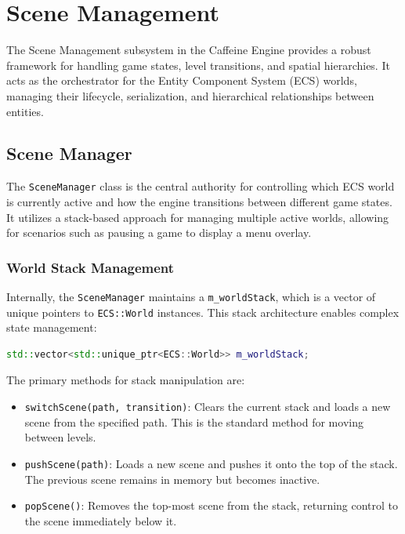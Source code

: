 \chapter{Scene Management}

The Scene Management subsystem in the Caffeine Engine provides a robust framework for handling game states, level transitions, and spatial hierarchies. It acts as the orchestrator for the Entity Component System (ECS) worlds, managing their lifecycle, serialization, and hierarchical relationships between entities.

\section{Scene Manager}

The \texttt{SceneManager} class is the central authority for controlling which ECS world is currently active and how the engine transitions between different game states. It utilizes a stack-based approach for managing multiple active worlds, allowing for scenarios such as pausing a game to display a menu overlay.

\subsection{World Stack Management}

Internally, the \texttt{SceneManager} maintains a \texttt{m\_worldStack}, which is a vector of unique pointers to \texttt{ECS::World} instances. This stack architecture enables complex state management:

\begin{lstlisting}[language=C++]
std::vector<std::unique_ptr<ECS::World>> m_worldStack;
\end{lstlisting}

The primary methods for stack manipulation are:

\begin{itemize}
    \item \texttt{switchScene(path, transition)}: Clears the current stack and loads a new scene from the specified path. This is the standard method for moving between levels.
    \item \texttt{pushScene(path)}: Loads a new scene and pushes it onto the top of the stack. The previous scene remains in memory but becomes inactive.
    \item \texttt{popScene()}: Removes the top-most scene from the stack, returning control to the scene immediately below it.
\end{itemize}

